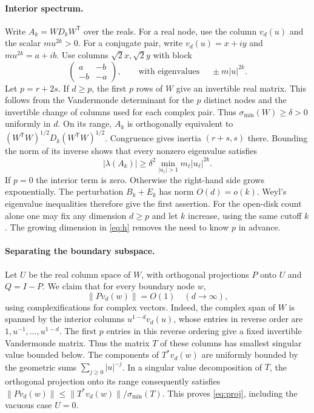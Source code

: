 \documentclass[11pt]{article}
\newcommand{\tr}{^{\mathsf T}}
\newcommand{\norm}[1]{\lVert #1\rVert}
\begin{document}
\paragraph{Interior spectrum.}
Write $A_k=W D_k W\tr$ over the reals. For a real node, use the column $v_d(u)$ and the scalar $mu^{2k}>0$. For a conjugate pair, write $v_d(u)=x+iy$ and $m u^{2k}=a+ib$. Use columns $\sqrt2 x,\sqrt2 y$ with block
\[
  \begin{pmatrix}a&-b\\-b&-a\end{pmatrix},
  \qquad \text{with eigenvalues }\quad \pm m|u|^{2k}.
\]
Let $p=r+2s$. If $d\ge p$, the first $p$ rows of $W$ give an invertible real matrix. This follows from the Vandermonde determinant for the $p$ distinct nodes and the invertible change of columns used for each complex pair. Thus $\sigma_{\min}(W)\ge\delta>0$ uniformly in $d$. On its range, $A_k$ is orthogonally equivalent to $(W\tr W)^{1/2}D_k(W\tr W)^{1/2}$. Congruence gives inertia $(r+s,s)$ there. Bounding the norm of its inverse shows that every nonzero eigenvalue satisfies
\begin{equation}
 |\lambda(A_k)|\ge \delta^2 \min_{|u_\ell|>1}m_\ell |u_\ell|^{2k}.
 \label{eq:lower}
\end{equation}
If $p=0$ the interior term is zero. Otherwise the right-hand side grows exponentially. The perturbation $B_k+E_k$ has norm $O(d)=o(k)$. Weyl's eigenvalue inequalities therefore give the first assertion. For the open-disk count alone one may fix any dimension $d\ge p$ and let $k$ increase, using the same cutoff $k$. The growing dimension in \eqref{eq:h} removes the need to know $p$ in advance.

\paragraph{Separating the boundary subspace.}
Let $U$ be the real column space of $W$, with orthogonal projections $P$ onto $U$ and $Q=I-P$. We claim that for every boundary node $w$,
\begin{equation}
 \norm{P v_d(w)}=O(1) \quad(d\to\infty),
 \label{eq:proj}
\end{equation}
using complexifications for complex vectors. Indeed, the complex span of $W$ is spanned by the interior columns $u^{1-d}v_d(u)$, whose entries in reverse order are $1,u^{-1},\ldots,u^{1-d}$. The first $p$ entries in this reverse ordering give a fixed invertible Vandermonde matrix. Thus the matrix $T$ of these columns has smallest singular value bounded below. The components of $T^*v_d(w)$ are uniformly bounded by the geometric sums $\sum_{j\ge0}|u|^{-j}$. In a singular value decomposition of $T$, the orthogonal projection onto its range consequently satisfies $\norm{Pv_d(w)}\le \norm{T^*v_d(w)}/\sigma_{\min}(T)$. This proves \eqref{eq:proj}, including the vacuous case $U=0$.
\end{document}
